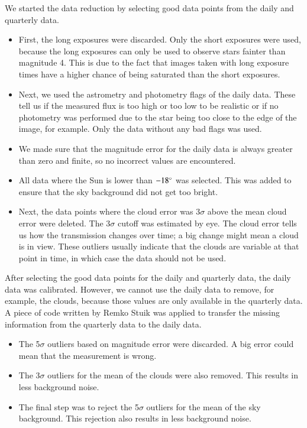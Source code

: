 \documentclass[onecolumn]{aa} %
\begin{document}
We started the data reduction by selecting good data points from the daily and quarterly data. 
\begin{itemize}
    \item First, the long exposures were discarded. Only the short exposures were used, because the long exposures can only be used to observe stars fainter than magnitude 4. This is due to the fact that images taken with long exposure times have a higher chance of being saturated than the short exposures.
    \item Next, we used the astrometry and photometry flags of the daily data. These tell us if the measured flux is too high or too low to be realistic or if no photometry was performed due to the star being too close to the edge of the image, for example. Only the data without any bad flags was used. 
    \item We made sure that the magnitude error for the daily data is always greater than zero and finite, so no incorrect values are encountered.
    \item All data where the Sun is lower than $-18^\circ$ was selected. This was added to ensure that the sky background did not get too bright. 
    \item Next, the data points where the cloud error was 3$\sigma$ above the mean cloud error were deleted. The 3$\sigma$ cutoff was estimated by eye. The cloud error tells us how the transmission changes over time; a big change might mean a cloud is in view. These outliers usually indicate that the clouds are variable at that point in time, in which case the data should not be used.
\end{itemize}
After selecting the good data points for the daily and quarterly data, the daily data was calibrated. However, we cannot use the daily data to remove, for example, the clouds, because those values are only available in the quarterly data. A piece of code written by Remko Stuik was applied to transfer the missing information from the quarterly data to the daily data. 
\begin{itemize}
    \item The 5$\sigma$ outliers based on magnitude error were discarded. A big error could mean that the measurement is wrong. 
    \item The 3$\sigma$ outliers for the mean of the clouds were also removed. This results in less background noise.
    \item The final step was to reject the 5$\sigma$ outliers for the mean of the sky background. This rejection also results in less background noise.
\end{itemize}
\end{document}

